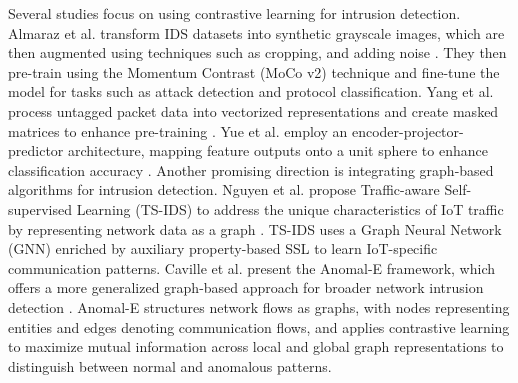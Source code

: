 Several studies focus on using contrastive learning for intrusion detection. Almaraz et al. transform IDS datasets into synthetic grayscale images, which are then augmented using techniques such as cropping, and adding noise \cite{almaraz2023enhancing}. They then pre-train using the Momentum Contrast (MoCo v2) technique and fine-tune the model for tasks such as attack detection and protocol classification. Yang et al. process untagged packet data into vectorized representations and create masked matrices to enhance pre-training \cite{yang2023malicious}. Yue et al. employ an encoder-projector-predictor architecture, mapping feature outputs onto a unit sphere to enhance classification accuracy \cite{yue2022contrastive}. 
Another promising direction is integrating graph-based algorithms for intrusion detection. Nguyen et al. propose Traffic-aware Self-supervised Learning (TS-IDS) to address the unique characteristics of IoT traffic by representing network data as a graph \cite{nguyen2023ts}. TS-IDS uses a Graph Neural Network (GNN) enriched by auxiliary property-based SSL to learn IoT-specific communication patterns. Caville et al. present the Anomal-E framework, which offers a more generalized graph-based approach for broader network intrusion detection \cite{caville2022anomal}. Anomal-E structures network flows as graphs, with nodes representing entities and edges denoting communication flows, and applies contrastive learning to maximize mutual information across local and global graph representations to distinguish between normal and anomalous patterns. 

